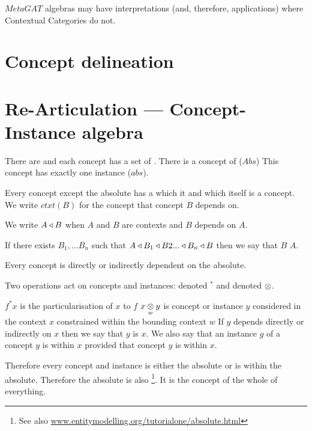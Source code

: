 \documentclass[10pt,a4paper]{article}
\begin{document}
\noindent $MetaGAT$ algebras may have interpretations (and, therefore, applications) where Contextual Categories do not.

\section{Concept delineation}

\section{Re-Articulation ---  Concept-Instance algebra}

\mynote
There are  and each concept has a set of . There is a concept of ($Abs$)
 This concept has exactly one instance ($abs$). 

\mynote
Every concept except the absolute has a  which it  and which itself is a concept. 
We write $ctxt(B)$
for the  concept that concept $B$ depends on.

We write $A \base B$  when  $A$ and $B$ are contexts and $B$ depends on $A$.

\mynote
If there exists $B_1,...B_n$ such that
$A \base B_1 \base B2 ... \base B_n \base B$ then we say that $B$  $A$.

\mynote Every concept is directly or indirectly dependent on the absolute.

\mynote
Two operations act on concepts and instances:  denoted
$^*$ and   denoted $\cross$.

\mynote
$f^*x$ is the particularisation of $x$ to $f$
\mynote
$\crossx{x}{y}{w}$ is concept or instance $y$ considered in the context $x$ constrained within the bounding context $w$
\mynote
If $y$ depends directly or indirectly on $x$ then we say that $y$ is  $x$.
We also say that an instance $g$ of a concept $y$ is within $x$ provided that concept $y$ is within $x$.

\mynote 
Therefore every concept and instance is either the absolute or is within the absolute.
Therefore the absolute  is also \footnote{See also \url{www.entitymodelling.org/tutorialone/absolute.html}}. It is the concept of the whole of everything.
\end{document}
